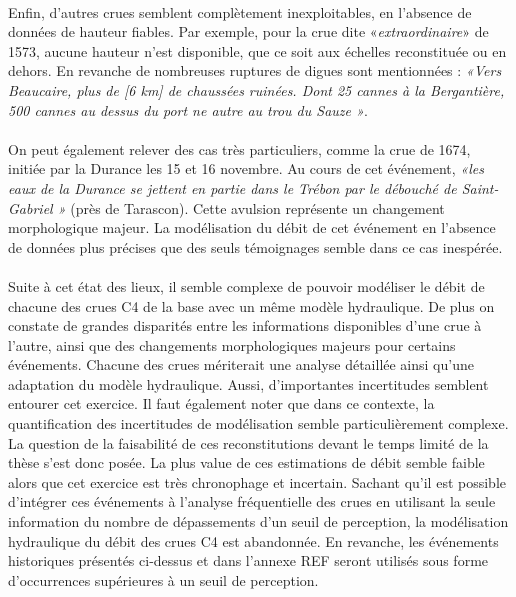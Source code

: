 	\paragraph{} Enfin, d'autres crues semblent complètement inexploitables, en l'absence de données de hauteur fiables. Par exemple, pour la crue dite «\textit{extraordinaire}» de 1573, aucune hauteur n'est disponible, que ce soit aux échelles reconstituée ou en dehors. En revanche de nombreuses ruptures de digues sont mentionnées : \textit{«Vers Beaucaire, plus de [6 km] de chaussées ruinées. Dont 25 cannes à la Bergantière, 500 cannes au dessus du port ne autre au trou du Sauze »}. 
	
	\paragraph{} On peut également relever des cas très particuliers, comme la crue de 1674, initiée par la Durance les 15 et 16 novembre. Au cours de cet événement, \textit{«les eaux de la Durance se jettent en partie dans le Trébon par le débouché de Saint-Gabriel »} (près de Tarascon). Cette avulsion représente un changement morphologique majeur. La modélisation du débit de cet événement en l'absence de données plus précises que des seuls témoignages semble dans ce cas inespérée.	
	
	\paragraph{} Suite à cet état des lieux, il semble complexe de pouvoir modéliser le débit de chacune des crues C4 de la base avec un même modèle hydraulique. De plus on constate de grandes disparités entre les informations disponibles d'une crue à l'autre, ainsi que des changements morphologiques majeurs pour certains événements. Chacune des crues mériterait une analyse détaillée ainsi qu'une adaptation du modèle hydraulique. Aussi, d'importantes incertitudes semblent entourer cet exercice. Il faut également noter que dans ce contexte, la quantification des incertitudes de modélisation semble particulièrement complexe. La question de la faisabilité de ces reconstitutions devant le temps limité de la thèse s'est donc posée. La plus value de ces estimations de débit semble faible alors que cet exercice est très chronophage et incertain. Sachant qu'il est possible d'intégrer ces événements à l'analyse fréquentielle des crues en utilisant la seule information du nombre de dépassements d'un seuil de perception, la modélisation hydraulique du débit des crues C4 est abandonnée. En revanche, les événements historiques présentés ci-dessus et dans l'annexe REF seront utilisés sous forme d'occurrences supérieures à un seuil de perception. 
	
